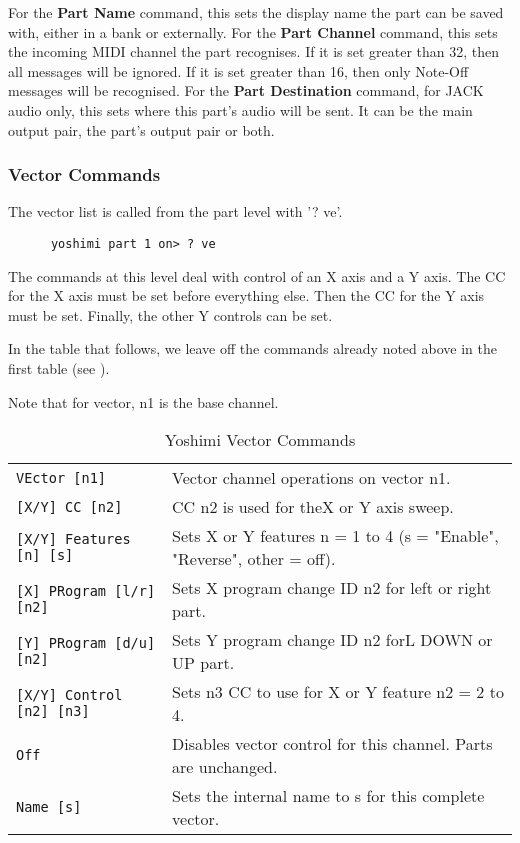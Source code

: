    For the \textbf{Part Name} command, this sets the display name the part can
   be saved with, either in a bank or externally.
   For the \textbf{Part Channel} command, this sets the incoming MIDI channel
   the part recognises. If it is set greater than 32, then all messages will be
   ignored.  If it is set greater than 16, then only Note-Off messages will be
   recognised.
   For the \textbf{Part Destination} command, for JACK audio only,
   this sets where this part's audio will be sent. It can be the main output
   pair, the part's output pair or both.

\subsubsection{Vector Commands}
\label{subsec:command_line_vector_command_list}

   The vector list is called from the part level with '? ve'.

   \begin{verbatim}
      yoshimi part 1 on> ? ve
   \end{verbatim}

   The commands at this level deal with control of an X axis and a Y axis.
   The CC for the X axis must be set before everything else.  Then the CC for
   the Y axis must be set.  Finally, the other Y controls can be set.

   In the table that follows, we leave off the commands already noted
   above in the first table
   (see ).

   Note that for vector, n1 is the base channel.

   \begin{table}[H]
      \centering
      \caption{Yoshimi Vector Commands}
      \label{table:yoshimi_text_vector_commands}
      \begin{tabular}{l l}

\texttt{VEctor [n1]} &
   Vector channel operations on vector n1. \\
\texttt{[X/Y] CC [n2]} &
   CC n2 is used for theX or Y axis sweep. \\
\texttt{[X/Y] Features [n] [s]} &
   Sets X or Y features n = 1 to 4 (s = "Enable", "Reverse", other = off).  \\
\texttt{[X] PRogram [l/r] [n2]} &
   Sets X program change ID n2 for left or right part. \\
\texttt{[Y] PRogram [d/u] [n2]} &
   Sets Y program change ID n2 forL DOWN or UP part. \\
\texttt{[X/Y] Control [n2] [n3]} &
   Sets n3 CC to use for X or Y feature n2 = 2 to 4. \\
\texttt{Off} &
   Disables vector control for this channel.  Parts are unchanged. \\
\texttt{Name [s]} &
   Sets the internal name to s for this complete vector.  \\

      \end{tabular}
   \end{table}

